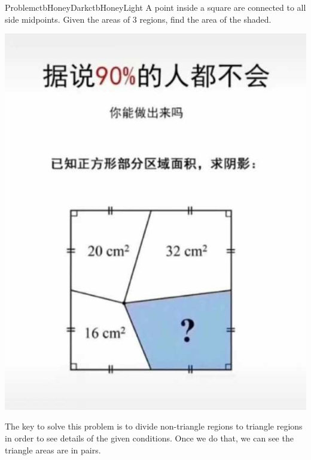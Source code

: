 \documentclass[12pt]{simple_doc}
\begin{document}

    \begin{cbstripe}{Problem}{ctbHoneyDark}{ctbHoneyLight}
        A point inside a square are connected to all side midpoints.
        Given the areas of 3 regions, find the area of the shaded. \medskip

        \centering\includegraphics[scale=.3]{square_area}
    \end{cbstripe}

    The key to solve this problem is to divide non-triangle regions to triangle regions in order
    to see details of the given conditions. Once we do that, we can see the triangle areas are
    in pairs.

\end{document}

